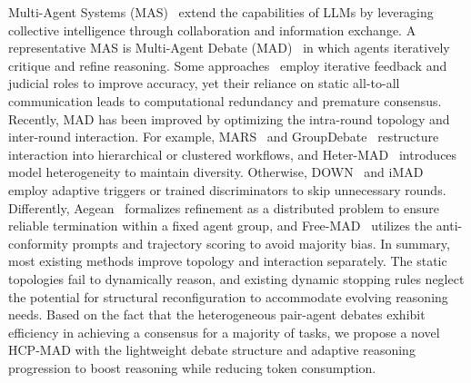 \documentclass[11pt]{article}
\begin{document}
Multi-Agent Systems (MAS)~\cite{li2023theory,wu2024autogen} extend the capabilities of LLMs by leveraging collective intelligence through collaboration and information exchange. 
A representative MAS is  Multi-Agent Debate (MAD)~\cite{chan2023chateval,liang2024encouraging} in which agents iteratively critique and refine reasoning. 
Some approaches~\cite{chan2023chateval,chen2024reconcile} employ iterative feedback and judicial roles to improve accuracy, yet their reliance on static all-to-all communication leads to computational redundancy and premature consensus.
Recently, MAD has been improved by optimizing the intra-round topology and inter-round interaction. 
For example, MARS~\cite{wang2025mars} and GroupDebate~\cite{liu2024groupdebate} restructure interaction into hierarchical or clustered workflows, and Heter-MAD~\cite{zhang2025stop} introduces model heterogeneity to maintain diversity. 
Otherwise, DOWN~\cite{eo2025debate} and iMAD~\cite{fan2025imad} employ adaptive triggers or trained discriminators to skip unnecessary rounds.
Differently, Aegean~\cite{ruan2025reaching} formalizes refinement as a distributed problem to ensure reliable termination within a fixed agent group, and Free-MAD~\cite{cui2025free} utilizes the anti-conformity prompts and trajectory scoring to avoid majority bias.
In summary, most existing methods improve topology and interaction separately. 
The static topologies fail to dynamically reason, and existing dynamic stopping rules neglect the potential for structural reconfiguration to accommodate evolving reasoning needs.
Based on the fact that the heterogeneous pair-agent debates exhibit efficiency in achieving a consensus for a majority of tasks, we propose a novel HCP-MAD with the lightweight debate structure and adaptive reasoning progression to boost reasoning while reducing token consumption.


\end{document}
